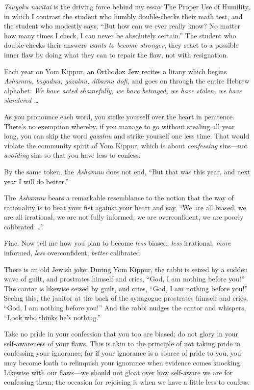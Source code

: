 {
 \textit{Tsuyoku naritai} is the driving force behind my essay The
Proper Use of Humility, in which I contrast the student who humbly
double-checks their math test, and the student who modestly says,
``But how can we ever really know? No matter how many
times I check, I can never be absolutely certain.''
The student who double-checks their answers \textit{wants to become
stronger}; they react to a possible inner flaw by doing what they can
to repair the flaw, not with resignation.}

{
 Each year on Yom Kippur, an Orthodox Jew recites a litany which
begins \textit{Ashamnu, bagadnu, gazalnu, dibarnu dofi}, and goes on
through the entire Hebrew alphabet: \textit{We have acted shamefully,
we have betrayed, we have stolen, we have slandered \ldots}}

{
 As you pronounce each word, you strike yourself over the heart in
penitence. There's no exemption whereby, if you manage
to go without stealing all year long, you can skip the word
\textit{gazalnu} and strike yourself one less time. That would violate
the community spirit of Yom Kippur, which is about \textit{confessing}
sins---not \textit{avoiding} sins so that you have less to confess.}

{
 By the same token, the \textit{Ashamnu} does not end,
``But that was this year, and next year I will do
better.''}

{
 The \textit{Ashamnu} bears a remarkable resemblance to the notion
that the way of rationality is to beat your fist against your heart and
say, ``We are all biased, we are all irrational, we
are not fully informed, we are overconfident, we are poorly calibrated
\ldots''}

{
 Fine. Now tell me how you plan to become \textit{less} biased,
\textit{less} irrational, \textit{more} informed, \textit{less}
overconfident, \textit{better} calibrated.}

{
 There is an old Jewish joke: During Yom Kippur, the rabbi is
seized by a sudden wave of guilt, and prostrates himself and cries,
``God, I am nothing before you!''
The cantor is likewise seized by guilt, and cries,
``God, I am nothing before you!''
Seeing this, the janitor at the back of the synagogue prostrates
himself and cries, ``God, I am nothing before
you!'' And the rabbi nudges the cantor and whispers,
``Look who thinks he's
nothing.''}

{
 Take no pride in your confession that you too are biased; do not
glory in your self-awareness of your flaws. This is akin to the
principle of not taking pride in confessing your ignorance; for if your
ignorance is a source of pride to you, you may become loath to
relinquish your ignorance when evidence comes knocking. Likewise with
our flaws---we should not gloat over how self-aware we are for
confessing them; the occasion for rejoicing is when we have a little
less to confess.}

